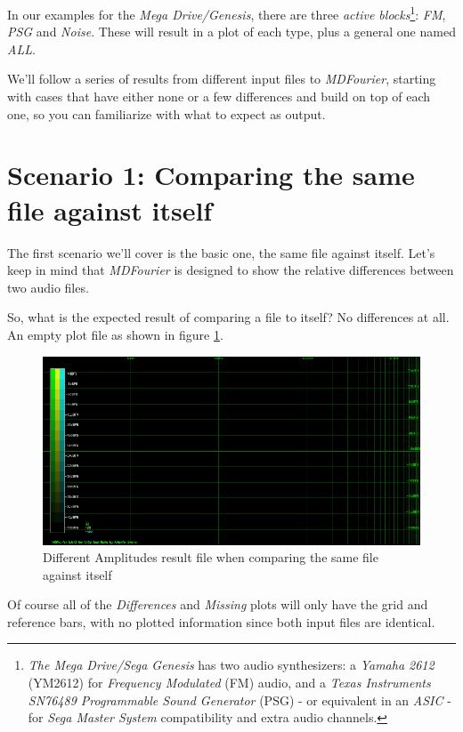\documentclass[10pt,a4paper]{report}
\begin{document}
In our examples for the \textit{Mega Drive/Genesis}, there are three \textit{active blocks}\footnote{\textit{The Mega Drive/Sega Genesis} has two audio synthesizers: a \textit{Yamaha 2612} (YM2612) for \textit{Frequency Modulated} (FM) audio, and a \textit{Texas Instruments SN76489 Programmable Sound Generator} (PSG)  - or equivalent in an \textit{ASIC} - for \textit{Sega Master System} compatibility and extra audio channels. }: \textit{FM}, \textit{PSG} and \textit{Noise}. These will result in a plot of each type, plus a general one named \textit{ALL}.

We'll follow a series of results from different input files to \textit{MDFourier}, starting with cases that have either none or a few differences and build on top of each one, so you can familiarize with what to expect as output.

\section{Scenario 1: Comparing the same file against itself}

The first scenario we'll cover is the basic one, the same file against itself. Let's keep in mind that \textit{MDFourier} is designed to show the relative differences between two audio files.

So, what is the expected result of comparing a file to itself? No differences at all. An empty plot file as shown in figure \ref{fig:plot1-samefile}.

\begin{figure}[H]
	\centering
	\includegraphics[width=1.0\linewidth]{images/interpretation/Plot1-SameFile.png}
	\caption[Same file compared]{Different Amplitudes result file when comparing the same file against itself}
	\label{fig:plot1-samefile}
\end{figure}

Of course all of the \textit{Differences} and \textit{Missing} plots will only have the grid and reference bars, with no plotted information since both input files are identical. 
\end{document}
